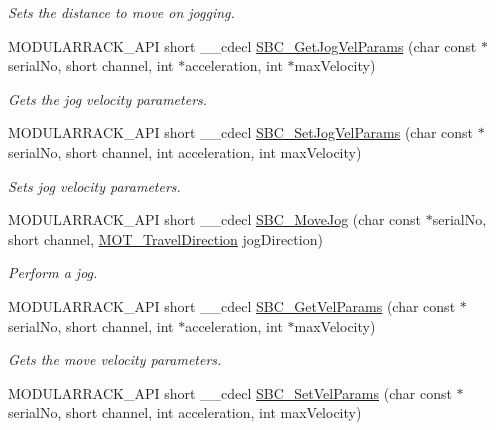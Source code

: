 \begin{DoxyCompactItemize}
\begin{DoxyCompactList}\small\item\em Sets the distance to move on jogging. \end{DoxyCompactList}\item 
M\+O\+D\+U\+L\+A\+R\+R\+A\+C\+K\+\_\+\+A\+PI short \+\_\+\+\_\+cdecl \hyperlink{group___modular_stepper_ga1b632302486b3617738b6767ad4e35a7}{S\+B\+C\+\_\+\+Get\+Jog\+Vel\+Params} (char const $\ast$serial\+No, short channel, int $\ast$acceleration, int $\ast$max\+Velocity)
\begin{DoxyCompactList}\small\item\em Gets the jog velocity parameters. \end{DoxyCompactList}\item 
M\+O\+D\+U\+L\+A\+R\+R\+A\+C\+K\+\_\+\+A\+PI short \+\_\+\+\_\+cdecl \hyperlink{group___modular_stepper_ga305932eea81f7311db96c71d4006020b}{S\+B\+C\+\_\+\+Set\+Jog\+Vel\+Params} (char const $\ast$serial\+No, short channel, int acceleration, int max\+Velocity)
\begin{DoxyCompactList}\small\item\em Sets jog velocity parameters. \end{DoxyCompactList}\item 
M\+O\+D\+U\+L\+A\+R\+R\+A\+C\+K\+\_\+\+A\+PI short \+\_\+\+\_\+cdecl \hyperlink{group___modular_stepper_ga301e0b3dca85f99240774daa6ae3dcf2}{S\+B\+C\+\_\+\+Move\+Jog} (char const $\ast$serial\+No, short channel, \hyperlink{group___common_ga70a2a2ac296464f3d846c30d71d18daa}{M\+O\+T\+\_\+\+Travel\+Direction} jog\+Direction)
\begin{DoxyCompactList}\small\item\em Perform a jog. \end{DoxyCompactList}\item 
M\+O\+D\+U\+L\+A\+R\+R\+A\+C\+K\+\_\+\+A\+PI short \+\_\+\+\_\+cdecl \hyperlink{group___modular_stepper_ga229aea47f5f8e0017ac6401837504f92}{S\+B\+C\+\_\+\+Get\+Vel\+Params} (char const $\ast$serial\+No, short channel, int $\ast$acceleration, int $\ast$max\+Velocity)
\begin{DoxyCompactList}\small\item\em Gets the move velocity parameters. \end{DoxyCompactList}\item 
M\+O\+D\+U\+L\+A\+R\+R\+A\+C\+K\+\_\+\+A\+PI short \+\_\+\+\_\+cdecl \hyperlink{group___modular_stepper_gaa6733256462ffa7562195225f7321b1a}{S\+B\+C\+\_\+\+Set\+Vel\+Params} (char const $\ast$serial\+No, short channel, int acceleration, int max\+Velocity)

\end{DoxyCompactItemize}
